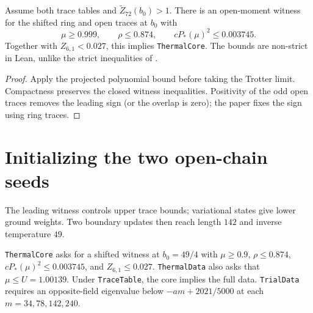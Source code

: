 \begin{theorem}
  \label{thm:boundary-leading}
  \leanok
  Assume both trace tables and
  \(\widetilde Z_{72}(b_0)>1\).
  There is an open-moment witness for the shifted ring and open traces at \(b_0\) with
  \[
    \mu\ge0.999,\qquad \rho\le0.874,\qquad cP_*(\mu)^2\le0.003745.
  \]
  Together with \(Z_{6,1}<0.027\), this implies \texttt{ThermalCore}.
  The bounds are non-strict in Lean, unlike the strict inequalities of
  \cite[Proposition 3.4 and Proposition A.1]{OpenAIBoundary}.
\end{theorem}
\begin{proof}
  \leanok
  Apply the projected polynomial bound before taking the Trotter limit.
  Compactness preserves the closed witness inequalities.
  Positivity of the odd open traces removes the leading sign (or the overlap is zero);
  the paper fixes the sign using ring traces.
\end{proof}

\section{Initializing the two open-chain seeds}

The leading witness controls upper trace bounds; variational states give lower ground weights.
Two boundary updates then reach length \(142\) and inverse temperature \(49\).

\begin{definition}
  \label{def:boundary-init-data}
  \leanok
  \texttt{ThermalCore} asks for a shifted witness at \(b_0=49/4\) with
  \(\mu\ge0.9\), \(\rho\le0.874\), \(cP_*(\mu)^2\le0.003745\), and \(Z_{6,1}\le0.027\).
  \texttt{ThermalData} also asks that \(\mu\le U=1.00139\).
  Under \texttt{TraceTable}, the core implies the full data.
  \texttt{TrialData} requires an opposite-field eigenvalue below
  \(-am+2021/5000\) at each \(m=34,78,142,240\).
\end{definition}

